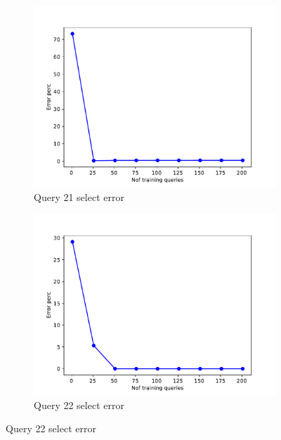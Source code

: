 \begin{figure}[!htb]
     \begin{subfigure}[t]{0.5\textwidth}
       \includegraphics[scale=0.4]{figs/tpch10/tpch10_sel21_error.pdf}
       \caption{Query 21 select error}
       \label{fig:tpch_sel21}
     \end{subfigure}
     \begin{subfigure}[t]{0.5\textwidth}
       \includegraphics[scale=0.4]{figs/tpch10/tpch10_sel22_error.pdf}
       \caption{Query 22 select error}
       \label{fig:tpch_sel22}
      \end{subfigure}
\end{figure}



